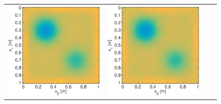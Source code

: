 \documentclass{iopart}
\begin{document}
\begin{figure}
\centering
\begin{tabular}{cccc}
\includegraphics[scale=.2]{./figs/2D_exp1_f}&
\includegraphics[scale=.2]{./figs/2D_exp1_g}&

\end{tabular}
\end{figure}
\end{document}
